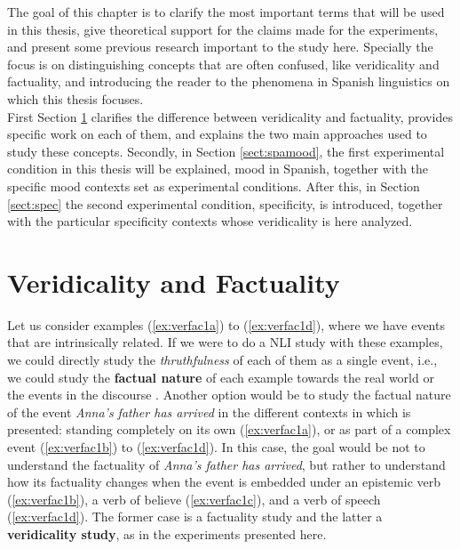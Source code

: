 \label{chap:back}
The goal of this chapter is to clarify the most important terms that will be used in this thesis, give theoretical support for the claims made for the experiments, and present some previous research important to the study here. Specially the focus is on distinguishing concepts that are often confused, like veridicality and factuality, and introducing the reader to the phenomena in Spanish linguistics on which this thesis focuses.\\

First Section \ref{sect:verandfact} clarifies the difference between veridicality and factuality, provides specific work on each of them, and explains the two main approaches used to study these concepts. Secondly, in Section \ref{sect:spamood}, the first experimental condition in this thesis will be explained, mood in Spanish, together with the specific mood contexts set as experimental conditions. After this, in Section \ref{sect:spec} the second experimental condition, specificity, is introduced, together with the particular specificity contexts whose veridicality is here analyzed.\\

\section{Veridicality and Factuality}
\label{sect:verandfact}

Let us consider examples (\ref{ex:verfac1a}) to (\ref{ex:verfac1d}), where we have events that are intrinsically related. If we were to do a NLI study with these examples, we could directly study the \textit{thruthfulness} of each of them as a single event, i.e., we could study the \textbf{factual nature} of each example towards the real world or the events in the discourse \citep{sauri2009factbank}. Another option would be to study the factual nature of the event \textit{Anna's father has arrived} in the different contexts in which is presented: standing completely on its own (\ref{ex:verfac1a}), or as part of a complex event (\ref{ex:verfac1b}) to (\ref{ex:verfac1d}). In this case, the goal would be not to understand the factuality of \textit{Anna's father has arrived}, but rather to understand how its factuality changes when the event is embedded under an epistemic verb (\ref{ex:verfac1b}), a verb of believe (\ref{ex:verfac1c}), and a verb of speech (\ref{ex:verfac1d}). The former case is a factuality study and the latter a \textbf{veridicality study}, as in the experiments presented here.\\

